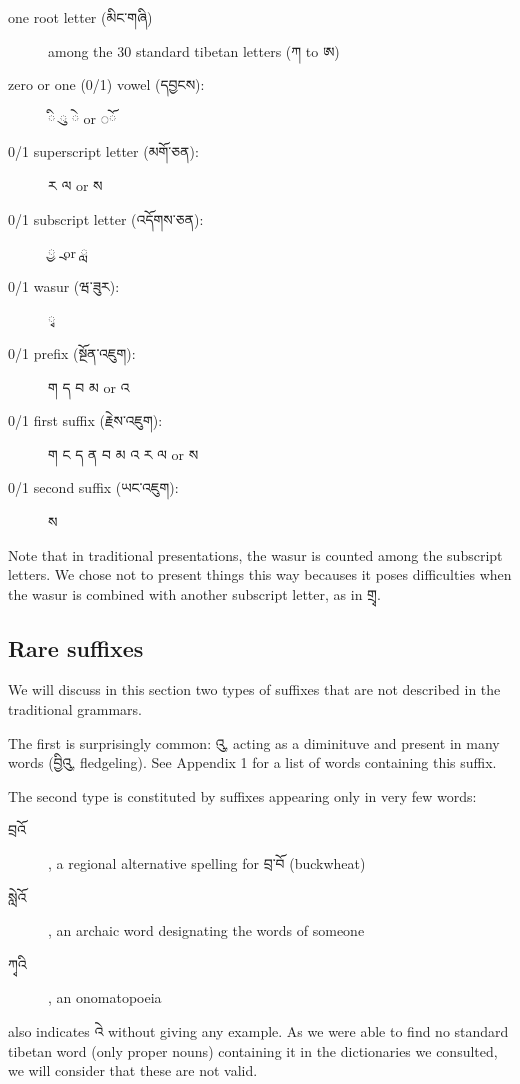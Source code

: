 \documentclass[%
a4paper,%
pagesize,%
12pt,%
parskip=off,%
bibliography=totoc,%
numbers=noenddot,%
DIV=12,%
twoside=semi,%
headings=normal%
]{scrartcl}
\begin{document}
\begin{description}
  \item[one root letter (མིང་གཞི)] among the 30 standard tibetan letters (ཀ to ཨ)
  \item[zero or one (0/1) vowel (དབྱངས):] {\tibetanfont ◌}ི {\tibetanfont ◌\kern 0.5mm}ུ {\tibetanfont ◌}ེ or {\tibetanfont ◌}ོ
  \item[0/1 superscript letter (མགོ་ཅན):] ར ལ or ས
  \item[0/1 subscript letter (འདོགས་ཅན):] ྱ ྲ or ླ
  \item[0/1 wasur (ཝ་ཟུར):] ྭ
  \item[0/1 prefix (སྔོན་འཇུག):] ག ད བ མ or འ
  \item[0/1 first suffix (རྗེས་འཇུག):] ག ང ད ན བ མ འ ར ལ or ས
  \item[0/1 second suffix (ཡང་འཇུག):] ས
\end{description}

Note that in traditional presentations, the wasur is counted among the subscript letters. We chose not to present things this way becauses it poses difficulties when the wasur is combined with another subscript letter, as in གྲྭ.

\subsection{Rare suffixes}

We will discuss in this section two types of suffixes that are not described in the traditional grammars.

The first is surprisingly common: འུ, acting as a diminituve and present in many words (བྱིའུ, fledgeling). See Appendix 1 for a list of words containing this suffix.

The second type is constituted by suffixes appearing only in very few words:

\begin{description}
\item[བྲའོ], a regional alternative spelling for བྲ་བོ (buckwheat)
\item[སླེའོ], an archaic word designating the words of someone
\item[ཀྭའི], an onomatopoeia
\end{description}

\cite{TournadreMST} also indicates འེ without giving any example. As we were able to find no standard tibetan word (only proper nouns) containing it in the dictionaries we consulted, we will consider that these are not valid.
\end{document}
